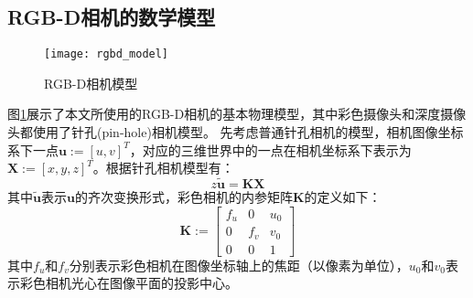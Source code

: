 \subsection{RGB-D相机的数学模型}
\begin{figure}[!ht]
  \centering
  \texttt{[image: rgbd\_model]}
  \caption{RGB-D相机模型}
  \label{fig:rgbd_model}
\end{figure}
图\ref{fig:rgbd_model}展示了本文所使用的RGB-D相机的基本物理模型，其中彩色摄像头和深度摄像头都使用了针孔(pin-hole)相机模型\cite{Heikkila2000}。
先考虑普通针孔相机的模型，相机图像坐标系下一点$\bm{u}:=[u,v]^T$，对应的三维世界中的一点在相机坐标系下表示为$\bm{X}:=[x,y,z]^T$。根据针孔相机模型有：
\begin{equation}
  \label{eq:cam_model}
  z\bm{\tilde{u}} = \bm{K}\bm{X}
\end{equation}
其中$\bm{\tilde{u}}$表示$\bm{u}$的齐次变换形式，彩色相机的内参矩阵$\bm{K}$的定义如下：
\begin{equation}
  \bm{K} := \left[
    \begin{array}{ccc}
      f_u&0&u_0 \\
      0&f_v&v_0 \\
      0&0&1
    \end{array}
  \right]
\end{equation}
其中$f_u$和$f_v$分别表示彩色相机在图像坐标轴上的焦距（以像素为单位），$u_0$和$v_0$表示彩色相机光心在图像平面的投影中心。

